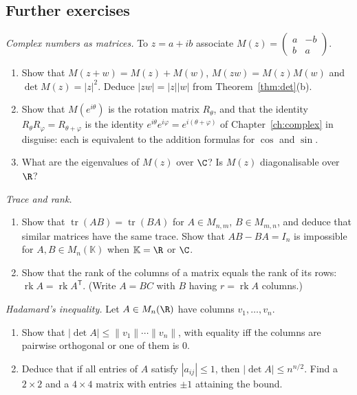 \subsection*{Further exercises}

\begin{exercise}[$\star$]\label{ex:twobytwo}
\emph{Complex numbers as matrices.} To $z=a+ib$ associate $M(z)=\begin{pmatrix}a&-b\\b&a\end{pmatrix}$.
\begin{enumerate}[label=(\alph*)]
\item Show that $M(z+w)=M(z)+M(w)$, $M(zw)=M(z)M(w)$ and $\det M(z)=|z|^2$. Deduce $|zw|=|z||w|$ from Theorem~\ref{thm:det}(b).
\item Show that $M(e^{i\theta})$ is the rotation matrix $R_\theta$, and that the identity $R_\theta R_\varphi=R_{\theta+\varphi}$ is the identity $e^{i\theta}e^{i\varphi}=e^{i(\theta+\varphi)}$ of Chapter~\ref{ch:complex} in disguise: each is equivalent to the addition formulas for $\cos$ and $\sin$.
\item What are the eigenvalues of $M(z)$ over $\C$? Is $M(z)$ diagonalisable over $\R$?
\end{enumerate}
\end{exercise}

\begin{exercise}[$\star\star$]\label{ex:tracerank}
\emph{Trace and rank.}
\begin{enumerate}[label=(\alph*)]
\item Show that $\operatorname{tr}(AB)=\operatorname{tr}(BA)$ for $A\in M_{n,m}$, $B\in M_{m,n}$, and deduce that similar matrices have the same trace. Show that $AB-BA=I_n$ is impossible for $A,B\in M_n(\mathbb K)$ when $\mathbb K=\R$ or $\C$.
\item Show that the rank of the columns of a matrix equals the rank of its rows: $\operatorname{rk}A=\operatorname{rk}A^{\mathsf T}$. (Write $A=BC$ with $B$ having $r=\operatorname{rk}A$ columns.)
\end{enumerate}
\end{exercise}

\begin{exercise}[$\star\star$]\label{ex:hadamard}
\emph{Hadamard's inequality.} Let $A\in M_n(\R)$ have columns $v_1,\dots,v_n$.
\begin{enumerate}[label=(\alph*)]
\item Show that $|\det A|\le\|v_1\|\cdots\|v_n\|$, with equality iff the columns are pairwise orthogonal or one of them is $0$.
\item Deduce that if all entries of $A$ satisfy $|a_{ij}|\le1$, then $|\det A|\le n^{n/2}$. Find a $2\times2$ and a $4\times4$ matrix with entries $\pm1$ attaining the bound.
\end{enumerate}
\end{exercise}

